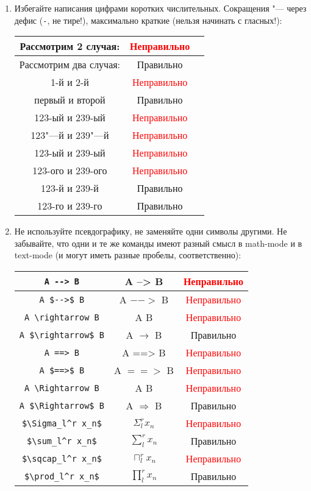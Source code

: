 \documentclass[12pt,a4paper]{book}
\newcommand{\ok}{& \textcolor{green!60!black}{Правильно}}
\newcommand{\bad}{& \textcolor{red}{Неправильно}}
\begin{document}
\begin{enumerate}
\item
	Избегайте написания цифрами коротких числительных.
	Сокращения "--- через дефис (\verb!-!, не тире!), максимально краткие (нельзя начинать с гласных!):
	\begin{center}\begin{tabular}{|c|c|c|}
		\hline Рассмотрим 2 случая: \bad \\
		\hline Рассмотрим два случая: \ok \\
		\hline 1-й и 2-й \bad \\
		\hline первый и второй \ok\\
		\hline 123-ый и 239-ый \bad \\
		\hline 123"---й и 239"---й \bad \\
		\hline 123-ый и 239-ый \bad \\
		\hline 123-ого и 239-ого \bad \\
		\hline 123-й и 239-й \ok \\
		\hline 123-го и 239-го \ok \\
		\hline
	\end{tabular}\end{center}

\item 
	Не используйте псевдографику, не заменяйте одни символы другими. 
	Не забывайте, что одни и те же команды имеют разный смысл в math-mode и в text-mode (и могут иметь разные пробелы, соответственно):
	\begin{center}\begin{tabular}{|c|c|c|}
		\hline \verb!A --> B! & A --> B \bad \\
		\hline \verb!A $-->$ B! & A $-->$ B \bad \\
		\hline \verb!A \rightarrow B! & A \rightarrow B \bad \\
		\hline \verb!A $\rightarrow$ B! & A $\rightarrow$ B \ok \\
		\hline \verb!A ==> B! & A ==> B \bad \\
		\hline \verb!A $==>$ B! & A $==>$ B \bad \\
		\hline \verb!A \Rightarrow B! & A \Rightarrow B \bad \\
		\hline \verb!A $\Rightarrow$ B! & A $\Rightarrow$ B \ok \\
		\hline \verb!$\Sigma_l^r x_n$! & $\Sigma_l^r x_n$ \bad \\
		\hline \verb!$\sum_l^r x_n$! & $\sum_l^r x_n$ \ok \\
		\hline \verb!$\sqcap_l^r x_n$! & $\sqcap_l^r x_n$ \bad \\
		\hline \verb!$\prod_l^r x_n$! & $\prod_l^r x_n$ \ok \\
		\hline
	\end{tabular}\end{center}


\end{enumerate}
\end{document}
